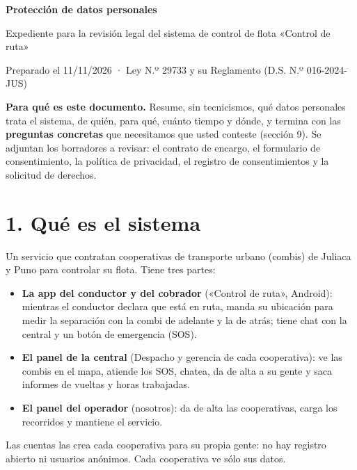 \documentclass[10.5pt,a4paper]{article}
\begin{document}

{\LARGE\bfseries Protección de datos personales}\par
{\large\color{tinta2}Expediente para la revisión legal del sistema de control de flota «Control de ruta»}\par
{\small\color{tenue}Preparado el 11/11/2026 · Ley N.º 29733 y su Reglamento (D.S. N.º 016-2024-JUS)}

\begin{nota}
\textbf{Para qué es este documento.} Resume, sin tecnicismos, qué datos
personales trata el sistema, de quién, para qué, cuánto tiempo y dónde, y
termina con las \textbf{preguntas concretas} que necesitamos que usted
conteste (sección 9). Se adjuntan los borradores a revisar: el contrato de
encargo, el formulario de consentimiento, la política de privacidad, el
registro de consentimientos y la solicitud de derechos.
\end{nota}

\section{1. Qué es el sistema}
Un servicio que contratan cooperativas de transporte urbano (combis) de
Juliaca y Puno para controlar su flota. Tiene tres partes:
\begin{itemize}[leftmargin=14pt]
\item \textbf{La app del conductor y del cobrador} («Control de ruta», Android):
  mientras el conductor declara que está en ruta, manda su ubicación para
  medir la separación con la combi de adelante y la de atrás; tiene chat con
  la central y un botón de emergencia (SOS).
\item \textbf{El panel de la central} (Despacho y gerencia de cada cooperativa):
  ve las combis en el mapa, atiende los SOS, chatea, da de alta a su gente y
  saca informes de vueltas y horas trabajadas.
\item \textbf{El panel del operador} (nosotros): da de alta las cooperativas,
  carga los recorridos y mantiene el servicio.
\end{itemize}
Las cuentas las crea cada cooperativa para su propia gente: no hay registro
abierto ni usuarios anónimos. Cada cooperativa ve sólo sus datos.
\end{document}
